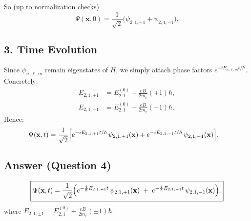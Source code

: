 \documentclass[12pt]{article}
\begin{document}
So (up to normalization checks)
\begin{equation}
\Psi(\mathbf{x},0) = \frac{1}{\sqrt{2}}\bigl(\psi_{2,1,+1} + \psi_{2,1,-1}\bigr).
\end{equation}

\subsection*{3. Time Evolution}
Since $\psi_{n,\ell,m}$ remain eigenstates of $H$, we simply attach phase factors $e^{-i E_{n,\ell,m} t/\hbar}$. Concretely:
\begin{align*}
E_{2,1,+1} &= E_{2,1}^{(0)} + \frac{eB}{2m_e}(+1)\hbar,\\
E_{2,1,-1} &= E_{2,1}^{(0)} + \frac{eB}{2m_e}(-1)\hbar.
\end{align*}
Hence:
\begin{align*}
\Psi(\mathbf{x},t)
&= \frac{1}{\sqrt{2}}\Bigl[e^{-i E_{2,1,+1} t/\hbar}\,\psi_{2,1,+1}(\mathbf{x}) + e^{-i E_{2,1,-1} t/\hbar}\,\psi_{2,1,-1}(\mathbf{x})\Bigr].
\end{align*}

\subsection*{Answer (Question 4)}
\begin{equation}
\boxed{
\Psi(\mathbf{x},t)
= \frac{1}{\sqrt{2}}\Bigl(e^{-\frac{i}{\hbar}E_{2,1,+1}t}\,\psi_{2,1,+1}(\mathbf{x}) \;+\; e^{-\frac{i}{\hbar}E_{2,1,-1}t}\,\psi_{2,1,-1}(\mathbf{x})\Bigr).
}
\end{equation}
where $E_{2,1,\pm1} = E_{2,1}^{(0)} + \tfrac{eB}{2m_e}(\pm1)\hbar.$
\end{document}
